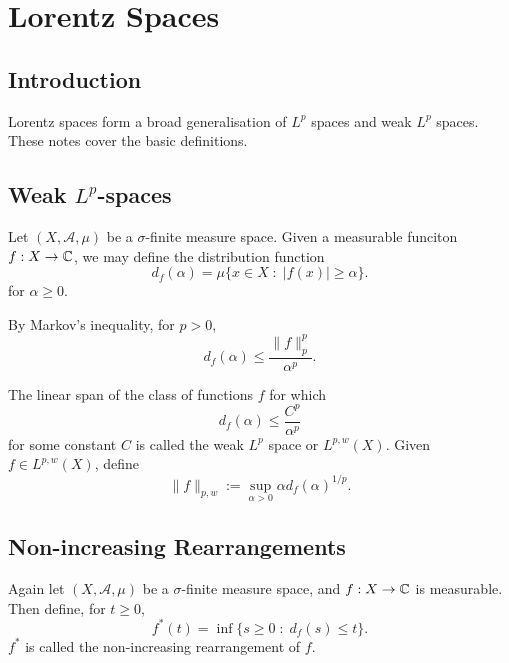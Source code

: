 
\chapter{Lorentz Spaces} %

\label{LorentzSpaces} %



\section{Introduction}
Lorentz spaces form a broad generalisation of $L^p$ spaces
and weak $L^p$ spaces. These notes cover the basic definitions.

\section{Weak $L^p$-spaces}
Let $(X,\mathcal{A},\mu)$ be a $\sigma$-finite measure space. 
Given a measurable funciton $f:X\rightarrow \mathbb{C}$, we may define the 
distribution function 
\begin{equation*}
    d_f(\alpha) = \mu\{x \in X\;:\;|f(x)| \geq \alpha\}.
\end{equation*}
for $\alpha \geq 0$. 

By Markov's inequality, for $p > 0$,
\begin{equation*}
    d_f(\alpha) \leq \frac{\|f\|_p^p}{\alpha^p}.
\end{equation*}

The linear span of the class of functions $f$ for which
\begin{equation*}
    d_f(\alpha) \leq \frac{C^p}{\alpha^p}
\end{equation*}
for some constant $C$ is called the weak $L^p$ space
or $L^{p,w}(X)$. Given $f \in L^{p,w}(X)$, define
\begin{equation*}
    \|f\|_{p,w} := \sup_{\alpha > 0} \alpha d_f(\alpha)^{1/p}.
\end{equation*}

\section{Non-increasing Rearrangements}
Again let $(X,\mathcal{A},\mu)$ be a $\sigma$-finite
measure space, and $f:X\rightarrow \mathbb{C}$ is measurable. Then define,
for $t \geq 0$,
\begin{equation*}
    f^*(t) = \inf\{s \geq 0\;:\;d_f(s) \leq t\}.
\end{equation*}
$f^*$ is called the non-increasing rearrangement of $f$.

